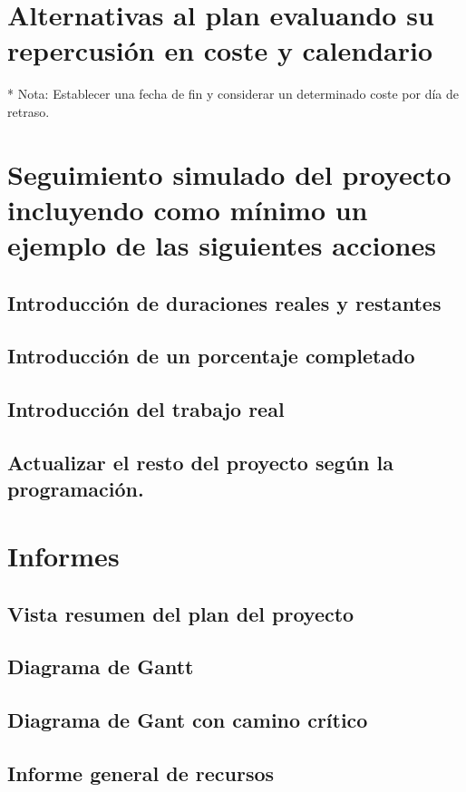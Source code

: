 \documentclass[11pt,a4paper,spanish,twoside]{report}
\begin{document}
\chapter{Alternativas al plan evaluando su repercusión en coste y 
  calendario}
* Nota: Establecer una fecha de fin y considerar un determinado coste por día
de retraso.

\chapter{Seguimiento simulado del proyecto incluyendo como 
  mínimo un ejemplo de las siguientes acciones}
\section{Introducción de duraciones reales y restantes}

\section{Introducción de un porcentaje completado}

\section{Introducción del trabajo real}

\section{Actualizar el resto del proyecto según la programación.}

\chapter{Informes}
\section{Vista resumen del plan del proyecto}

\section{Diagrama de Gantt}

\section{Diagrama de Gant con camino crítico}

\section{Informe general de recursos}
\end{document}
